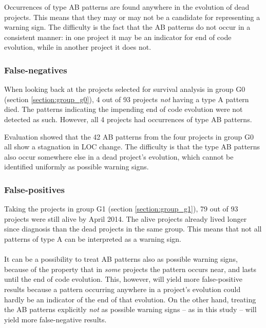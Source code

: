 

\noindent
Occurrences of type AB patterns are found anywhere in the evolution of dead
projects. This means that they may or may not be a candidate for representing a
warning sign. The difficulty is the fact that the AB patterns do not occur in a
consistent manner: in one project it may be an indicator for end of code
evolution, while in another project it does not.

\subsubsection{False-negatives}
When looking back at the projects selected for survival analysis in group G0
(section \ref{section:group_g0}), 4 out of 93 projects \textit{not} having a
type A pattern died. The patterns indicating the impending end of code
evolution were not detected as such. However, all 4 projects had occurrences of
type AB patterns.

Evaluation showed that the 42 AB patterns from the four projects in group
G0 all show a stagnation in LOC change. The difficulty is that the type AB
patterns also occur somewhere else in a dead project's evolution, which cannot
be identified uniformly as possible warning signs.

\subsubsection{False-positives}
Taking the projects in group G1 (section \ref{section:group_g1}), 79 out of 93
projects were still alive by April 2014. The alive projects already lived
longer since diagnosis than the dead projects in the same group. This means
that not all patterns of type A can be interpreted as a warning sign.

\paragraph{}
It can be a possibility to treat AB patterns also as possible warning signs,
because of the property that in \textit{some} projects the pattern occurs near,
and lasts until the end of code evolution. This, however, will yield more
false-positive results because a pattern occurring anywhere in a project's
evolution could hardly be an indicator of the end of that evolution.
On the other hand, treating the AB patterns explicitly \textit{not} as possible
warning signs -- as in this study -- will yield more false-negative results.

